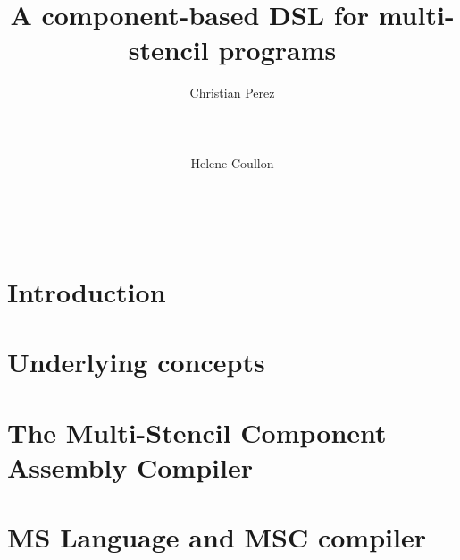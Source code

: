 \documentclass{acm_proc_article-sp}
\begin{document}
\title{A component-based DSL for multi-stencil programs}

\author{
\alignauthor
Christian Perez\\
       \\
       \\
       \\
\alignauthor
Helene Coullon\\
       \\
       \\
       \\
}

\maketitle

\begin{abstract}

\end{abstract}


\section{Introduction}
\label{sect:intro}

\section{Underlying concepts}
\label{sect:concept}

\section{The Multi-Stencil Component Assembly Compiler}
\label{sect:mscac}

\section{MS Language and MSC compiler}
\label{sect:msmsc}

\end{document}
